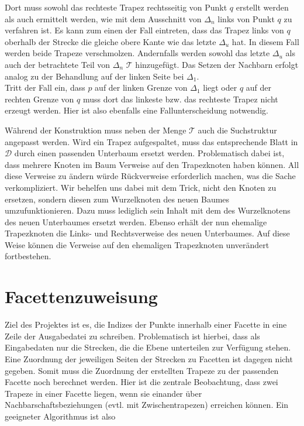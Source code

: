 \documentclass[11pt, a4paper]{article}
\newcommand{\T}{\ensuremath{\mathcal{T}} }
\newcommand{\D}{\ensuremath{\mathcal{D}} }
\begin{document}
Dort muss sowohl das rechteste Trapez rechtsseitig von Punkt $q$ erstellt werden als auch ermittelt werden, wie mit dem Ausschnitt von $\Delta_n$ links von Punkt $q$ zu verfahren ist. Es kann zum einen der Fall eintreten, dass das Trapez links von $q$ oberhalb der Strecke die gleiche obere Kante wie das letzte $\Delta_u$ hat. In diesem Fall werden beide Trapeze verschmolzen. Andernfalls werden sowohl das letzte $\Delta_u$ als auch der betrachtete Teil von $\Delta_n$ \T hinzugefügt. Das Setzen der Nachbarn erfolgt analog zu der Behandlung auf der linken Seite bei $\Delta_1$.\\
Tritt der Fall ein, dass $p$ auf der linken Grenze von $\Delta_1$ liegt oder $q$ auf der rechten Grenze von $q$ muss dort das linkeste bzw. das rechteste Trapez nicht erzeugt werden. Hier ist also ebenfalls eine Fallunterscheidung notwendig.

Während der Konstruktion muss neben der Menge \T auch die Suchstruktur angepasst werden. Wird ein Trapez aufgespaltet, muss das entsprechende Blatt in \D durch einen passenden Unterbaum ersetzt werden. Problematisch dabei ist, dass mehrere Knoten im Baum Verweise auf den Trapezknoten haben können. All diese Verweise zu ändern würde Rückverweise erforderlich machen, was die Sache verkompliziert.
Wir behelfen uns dabei mit dem Trick, nicht den Knoten zu ersetzen, sondern diesen zum Wurzelknoten des neuen Baumes umzufunktionieren. Dazu muss lediglich sein Inhalt mit dem des Wurzelknotens des neuen Unterbaumes ersetzt werden. Ebenso erhält der nun ehemalige Trapezknoten die Links- und Rechtsverweise des neuen Unterbaumes. Auf diese Weise können die Verweise auf den ehemaligen Trapezknoten unverändert fortbestehen. 

\section{Facettenzuweisung}
Ziel des Projektes ist es, die Indizes der Punkte innerhalb einer Facette in eine Zeile der Ausgabedatei zu schreiben. Problematisch ist hierbei, dass als Eingabedaten nur die Strecken, die die Ebene unterteilen zur Verfügung stehen. Eine Zuordnung der jeweiligen Seiten der Strecken zu Facetten ist dagegen nicht gegeben. Somit muss die Zuordnung der erstellten Trapeze zu der passenden Facette noch berechnet werden. Hier ist die zentrale Beobachtung, dass zwei Trapeze in einer Facette liegen, wenn sie einander über Nachbarschaftsbeziehungen (evtl. mit Zwischentrapezen) erreichen können. Ein geeigneter Algorithmus ist also
\end{document}
